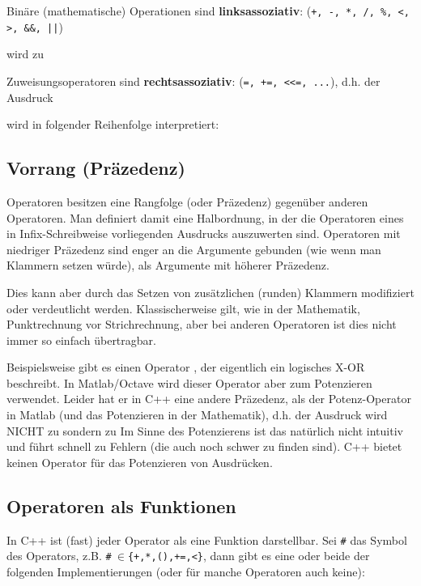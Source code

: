 \begin{example}
Binäre (mathematische) Operationen sind \textbf{linksassoziativ}: (\texttt{+, -, *, /, \%, <, >, \&\&, ||})

 wird zu 
\end{example}

\begin{example}
Zuweisungsoperatoren sind  \textbf{rechtsassoziativ}:  (\texttt{=, +=, <<=, ...}), d.h. der Ausdruck

 wird in folgender Reihenfolge interpretiert: 
\end{example}

\subsection{Vorrang (Präzedenz)\label{sec:operator-precedence}}
Operatoren besitzen eine Rangfolge (oder Präzedenz) gegenüber anderen Operatoren. Man definiert damit eine Halbordnung, in der die Operatoren eines in Infix-Schreibweise vorliegenden Ausdrucks auszuwerten sind. Operatoren mit niedriger Präzedenz sind enger an die Argumente gebunden (wie wenn man Klammern setzen würde), als Argumente mit höherer Präzedenz.

Dies kann aber durch das Setzen von zusätzlichen (runden) Klammern modifiziert oder verdeutlicht werden. Klassischerweise gilt, wie in der Mathematik, Punktrechnung vor Strichrechnung, aber bei anderen Operatoren ist dies nicht immer so einfach übertragbar.


\begin{example}
Beispielsweise gibt es einen Operator \cpp{^}, der eigentlich ein logisches X-OR beschreibt. In Matlab/Octave wird dieser Operator aber zum Potenzieren verwendet. Leider hat er in C++ eine andere Präzedenz, als der Potenz-Operator in Matlab (und das Potenzieren in der Mathematik), d.h. der Ausdruck
wird NICHT zu
sondern zu
Im Sinne des Potenzierens ist das natürlich nicht intuitiv und führt schnell zu Fehlern (die auch noch schwer zu finden sind). C++ bietet keinen Operator für das Potenzieren von Ausdrücken.
\end{example}


\subsection{Operatoren als Funktionen}
In C++ ist (fast) jeder Operator als eine Funktion darstellbar. Sei \texttt{\#} das Symbol des Operators, z.B. \texttt{\#$~\in$\{+,*,(),+=,<\}}, dann gibt es eine oder beide der folgenden Implementierungen (oder für manche Operatoren auch keine):

